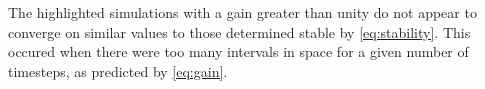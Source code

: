 \documentclass[a4paper,12pt,twocolumn]{article}
\begin{document}
The highlighted simulations with a gain greater than unity do not appear to
converge on similar values to those determined stable by \eqref{eq:stability}.
This occured when there were too many intervals in space for a given number of
timesteps, as predicted by \eqref{eq:gain}.

\printbibliography
\end{document}
